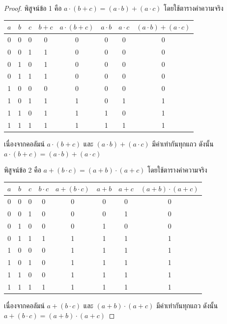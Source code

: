 \begin{proof}
พิสูจน์ข้อ 1 คือ $a \cdot (b + c) = (a \cdot b) + (a \cdot c)$ โดยใช้ตารางค่าความจริง

\begin{center}
\begin{tabular}{|c|c|c|c|c|c|c|c|}
\hline
$a$ & $b$ & $c$ & $b + c$ & $a \cdot (b + c)$ & $a \cdot b$ & $a \cdot c$ & $(a \cdot b) + (a \cdot c)$ \\
\hline
0 & 0 & 0 & 0 & 0 & 0 & 0 & 0 \\
\hline
0 & 0 & 1 & 1 & 0 & 0 & 0 & 0 \\
\hline
0 & 1 & 0 & 1 & 0 & 0 & 0 & 0 \\
\hline
0 & 1 & 1 & 1 & 0 & 0 & 0 & 0 \\
\hline
1 & 0 & 0 & 0 & 0 & 0 & 0 & 0 \\
\hline
1 & 0 & 1 & 1 & 1 & 0 & 1 & 1 \\
\hline
1 & 1 & 0 & 1 & 1 & 1 & 0 & 1 \\
\hline
1 & 1 & 1 & 1 & 1 & 1 & 1 & 1 \\
\hline
\end{tabular}
\end{center}

เนื่องจากคอลัมน์ $a \cdot (b + c)$ และ $(a \cdot b) + (a \cdot c)$ มีค่าเท่ากันทุกแถว ดังนั้น $a \cdot (b + c) = (a \cdot b) + (a \cdot c)$

พิสูจน์ข้อ 2 คือ $a + (b \cdot c) = (a + b) \cdot (a + c)$ โดยใช้ตารางค่าความจริง

\begin{center}
\begin{tabular}{|c|c|c|c|c|c|c|c|}
\hline
$a$ & $b$ & $c$ & $b \cdot c$ & $a + (b \cdot c)$ & $a + b$ & $a + c$ & $(a + b) \cdot (a + c)$ \\
\hline
0 & 0 & 0 & 0 & 0 & 0 & 0 & 0 \\
\hline
0 & 0 & 1 & 0 & 0 & 0 & 1 & 0 \\
\hline
0 & 1 & 0 & 0 & 0 & 1 & 0 & 0 \\
\hline
0 & 1 & 1 & 1 & 1 & 1 & 1 & 1 \\
\hline
1 & 0 & 0 & 0 & 1 & 1 & 1 & 1 \\
\hline
1 & 0 & 1 & 0 & 1 & 1 & 1 & 1 \\
\hline
1 & 1 & 0 & 0 & 1 & 1 & 1 & 1 \\
\hline
1 & 1 & 1 & 1 & 1 & 1 & 1 & 1 \\
\hline
\end{tabular}
\end{center}

เนื่องจากคอลัมน์ $a + (b \cdot c)$ และ $(a + b) \cdot (a + c)$ มีค่าเท่ากันทุกแถว ดังนั้น $a + (b \cdot c) = (a + b) \cdot (a + c)$
\end{proof}

